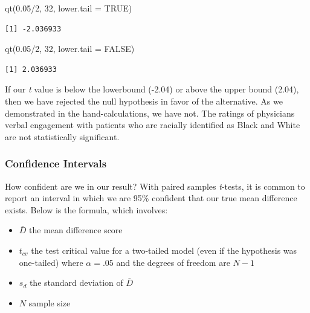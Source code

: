 \documentclass[
  11pt,
]{book}
\newenvironment{Shaded}{\begin{snugshade}}{\end{snugshade}}
\newcommand{\AttributeTok}[1]{\textcolor[rgb]{0.77,0.63,0.00}{#1}}
\newcommand{\ConstantTok}[1]{\textcolor[rgb]{0.00,0.00,0.00}{#1}}
\newcommand{\DecValTok}[1]{\textcolor[rgb]{0.00,0.00,0.81}{#1}}
\newcommand{\FloatTok}[1]{\textcolor[rgb]{0.00,0.00,0.81}{#1}}
\newcommand{\FunctionTok}[1]{\textcolor[rgb]{0.00,0.00,0.00}{#1}}
\newcommand{\NormalTok}[1]{#1}
\newcommand{\SpecialCharTok}[1]{\textcolor[rgb]{0.00,0.00,0.00}{#1}}
\providecommand{\tightlist}{%
  \setlength{\itemsep}{0pt}\setlength{\parskip}{0pt}}
\begin{document}
\begin{Shaded}
\begin{Highlighting}[]
\FunctionTok{qt}\NormalTok{(}\FloatTok{0.05}\SpecialCharTok{/}\DecValTok{2}\NormalTok{, }\DecValTok{32}\NormalTok{, }\AttributeTok{lower.tail =} \ConstantTok{TRUE}\NormalTok{)}
\end{Highlighting}
\end{Shaded}

\begin{verbatim}
[1] -2.036933
\end{verbatim}

\begin{Shaded}
\begin{Highlighting}[]
\FunctionTok{qt}\NormalTok{(}\FloatTok{0.05}\SpecialCharTok{/}\DecValTok{2}\NormalTok{, }\DecValTok{32}\NormalTok{, }\AttributeTok{lower.tail =} \ConstantTok{FALSE}\NormalTok{)}
\end{Highlighting}
\end{Shaded}

\begin{verbatim}
[1] 2.036933
\end{verbatim}

If our \emph{t} value is below the lowerbound (-2.04) or above the upper bound (2.04), then we have rejected the null hypothesis in favor of the alternative. As we demonstrated in the hand-calculations, we have not. The ratings of physicians verbal engagement with patients who are racially identified as Black and White are not statistically significant.

\hypertarget{confidence-intervals-2}{%
\subsubsection{Confidence Intervals}\label{confidence-intervals-2}}

How confident are we in our result? With paired samples \emph{t}-tests, it is common to report an interval in which we are 95\% confident that our true mean difference exists. Below is the formula, which involves:

\begin{itemize}
\tightlist
\item
  \(\bar{D}\) the mean difference score
\item
  \(t_{cv}\) the test critical value for a two-tailed model (even if the hypothesis was one-tailed) where \(\alpha = .05\) and the degrees of freedom are \(N-1\)
\item
  \(s_{d}\) the standard deviation of \(\bar{D}\)
\item
  \(N\) sample size
\end{itemize}
\end{document}
